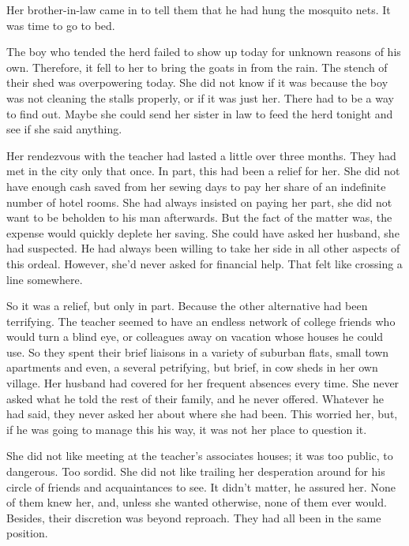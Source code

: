 \documentclass{article}
\begin{document}
Her brother-in-law came in to tell them that he had hung the mosquito nets. It was time to go to bed.

\vspace{.5cm}

The boy who tended the herd failed to show up today for unknown reasons of his own. Therefore, it fell to her to bring the goats in from the rain. The stench of their shed was overpowering today. She did not know if it was because the boy was not cleaning the stalls properly, or if it was just her. There had to be a way to find out. Maybe she could send her sister in law to feed the herd tonight and see if she said anything.

Her rendezvous with the teacher had lasted a little over three months. They had met in the city only that once. In part, this had been a relief for her. She did not have enough cash saved from her sewing days to pay her share of an indefinite number of hotel rooms. She had always insisted on paying her part, she did not want to be beholden to his man afterwards. But the fact of the matter was, the expense would quickly deplete her saving. She could have asked her husband, she had suspected. He had always been willing to take her side in all other aspects of this ordeal. However, she'd never asked for financial help. That felt like crossing a line somewhere.

So it was a relief, but only in part. Because the other alternative had been terrifying. The teacher seemed to have an endless network of college friends who would turn a blind eye, or colleagues away on vacation whose houses he could use. So they spent their brief liaisons in a variety of suburban flats, small town apartments and even, a several petrifying, but brief, in cow sheds in her own village. Her husband had covered for her frequent absences every time. She never asked what he told the rest of their family, and he never offered. Whatever he had said, they never asked her about where she had been. This worried her, but, if he was going to manage this his way, it was not her place to question it.  

She did not like meeting at the teacher's associates houses; it was too public, to dangerous. Too sordid. She did not like trailing her desperation around for his circle of friends and acquaintances to see. It didn't matter, he assured her. None of them knew her, and, unless she wanted otherwise, none of them ever would. Besides, their discretion was beyond reproach. They had all been in the same position. 
\end{document}
